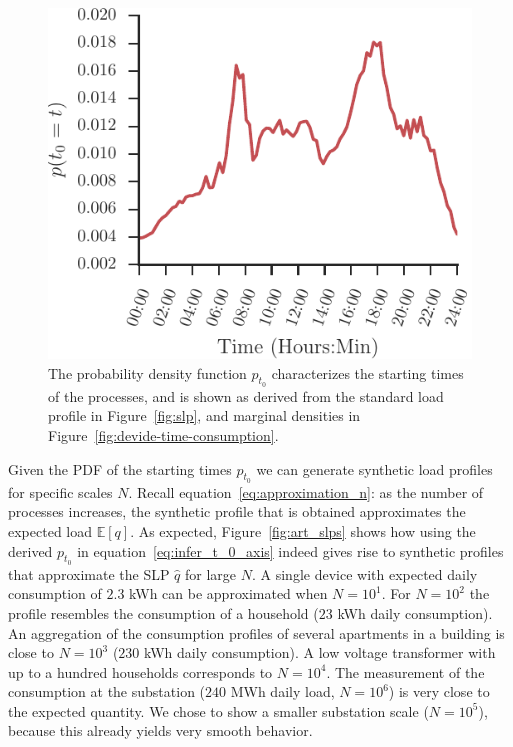 \documentclass[conference]{IEEEtran}
\begin{document}
\begin{figure}[b!]
\centering
\includegraphics[width=0.8\columnwidth]{figures/t_0.pdf}
\caption{The probability density function $p_{t_0}$ characterizes the starting times of the processes, and is shown as derived from the standard load profile in Figure~\ref{fig:slp}, and marginal densities in Figure~\ref{fig:devide-time-consumption}.}
\label{fig:distribution_t_0}
\end{figure}



Given the PDF of the starting times $p_{t_0}$ we can generate synthetic load profiles for specific scales $N$. Recall equation~\eqref{eq:approximation_n}: as the number of processes increases, the synthetic profile that is obtained  approximates the expected load $\mathbb{E}[q]$. As expected, Figure~\ref{fig:art_slps} shows how using the derived $p_{t_0}$ in equation~\eqref{eq:infer_t_0_axis} indeed gives rise to synthetic profiles that approximate the SLP $\hat{q}$ for large $N$. A single device with expected daily consumption of $2.3$ kWh can be approximated when $N=10^1$. For $N=10^2$ the profile resembles the consumption of a household ($23$ kWh daily consumption). An aggregation of the consumption profiles of several apartments in a building is close to $N=10^3$ ($230$ kWh daily consumption). A low voltage transformer with up to a hundred households corresponds to $N=10^4$. The measurement of the consumption at the substation ($240$ MWh daily load, $N=10^6$) is very close to the expected quantity. We chose to show a smaller substation scale ($N=10^5$), because this already yields very smooth behavior.
\end{document}
